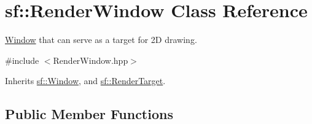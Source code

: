\hypertarget{classsf_1_1_render_window}{\section{sf\+:\+:Render\+Window Class Reference}
\label{classsf_1_1_render_window}
}


\hyperlink{classsf_1_1_window}{Window} that can serve as a target for 2\+D drawing.  




{\ttfamily \#include $<$Render\+Window.\+hpp$>$}



Inherits \hyperlink{classsf_1_1_window}{sf\+::\+Window}, and \hyperlink{classsf_1_1_render_target}{sf\+::\+Render\+Target}.

\subsection*{Public Member Functions}
